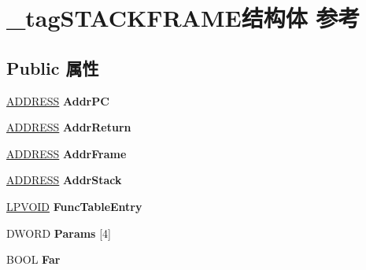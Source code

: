 \hypertarget{struct__tag_s_t_a_c_k_f_r_a_m_e}{}\section{\+\_\+tag\+S\+T\+A\+C\+K\+F\+R\+A\+M\+E结构体 参考}
\label{struct__tag_s_t_a_c_k_f_r_a_m_e}
\subsection*{Public 属性}
\begin{DoxyCompactItemize}
\item 
\mbox{\label{struct__tag_s_t_a_c_k_f_r_a_m_e_a9a5869eec07e8d76da6b3d9cbf02d1fb}} 
\hyperlink{struct__tag_a_d_d_r_e_s_s}{A\+D\+D\+R\+E\+SS} {\bfseries Addr\+PC}
\item 
\mbox{\label{struct__tag_s_t_a_c_k_f_r_a_m_e_a731d44547db7689b23e6f73f898fef0d}} 
\hyperlink{struct__tag_a_d_d_r_e_s_s}{A\+D\+D\+R\+E\+SS} {\bfseries Addr\+Return}
\item 
\mbox{\label{struct__tag_s_t_a_c_k_f_r_a_m_e_a63939d8b8153460c43c0e05dd31e3474}} 
\hyperlink{struct__tag_a_d_d_r_e_s_s}{A\+D\+D\+R\+E\+SS} {\bfseries Addr\+Frame}
\item 
\mbox{\label{struct__tag_s_t_a_c_k_f_r_a_m_e_a95d249a3b6604ad8abed7696496694cd}} 
\hyperlink{struct__tag_a_d_d_r_e_s_s}{A\+D\+D\+R\+E\+SS} {\bfseries Addr\+Stack}
\item 
\mbox{\label{struct__tag_s_t_a_c_k_f_r_a_m_e_a2975bf868cd50a75893dcb0b88e0afcb}} 
\hyperlink{interfacevoid}{L\+P\+V\+O\+ID} {\bfseries Func\+Table\+Entry}
\item 
\mbox{\label{struct__tag_s_t_a_c_k_f_r_a_m_e_af19645cc9eda7ee8ae77a1aa03b34d9f}} 
D\+W\+O\+RD {\bfseries Params} \mbox{[}4\mbox{]}
\item 
\mbox{\label{struct__tag_s_t_a_c_k_f_r_a_m_e_a8734ef29ee4c425caf625a356872008b}} 
B\+O\+OL {\bfseries Far}
\item 

\end{DoxyCompactItemize}
